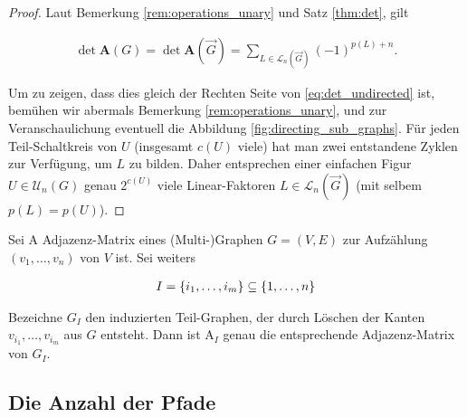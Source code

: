             \begin{proof}

                Laut Bemerkung \ref{rem:operations_unary} und Satz \ref{thm:det}, gilt

                \begin{align*}
                    \det \mathbf A(G)
                    =
                    \det \mathbf A(\vec G)
                    =
                    \sum_{L \in \mathcal L_n(\vec G)}
                        (-1)^{p(L) + n}.
                \end{align*}

                Um zu zeigen, dass dies gleich der Rechten Seite von \eqref{eq:det_undirected} ist, bemühen wir abermals Bemerkung \ref{rem:operations_unary}, und zur Veranschaulichung eventuell die Abbildung \ref{fig:directing_sub_graphs}.
                Für jeden Teil-Schaltkreis von $U$ (insgesamt $c(U)$ viele) hat man zwei entstandene Zyklen zur Verfügung, um $L$ zu bilden.
                Daher entsprechen einer einfachen Figur $U \in \mathcal U_n(G)$ genau $2^{c(U)}$ viele Linear-Faktoren $L \in \mathcal L_n(\vec G)$ (mit selbem $p(L) = p(U)$).

            \end{proof}

            \begin{remark} \label{rem:induced_sub_graphs}

                Sei $\mathrm A$ Adjazenz-Matrix eines (Multi-)Graphen $G = (V, E)$ zur Aufzählung $(v_1, \dots, v_n)$ von $V$ ist.
                Sei weiters

                \begin{align*}
                    I = {\left \{ i_1, \dots, i_m \right \}} \subseteq {\left \{ 1, \dots, n \right \}}
                \end{align*}

                Bezeichne $G_I$ den induzierten Teil-Graphen, der durch Löschen der Kanten $v_{i_1}, \dots, v_{i_m}$ aus $G$ entsteht.
                Dann ist $\mathrm A_I$ genau die entsprechende Adjazenz-Matrix von $G_I$.

            \end{remark}

        \subsection{Die Anzahl der Pfade}

